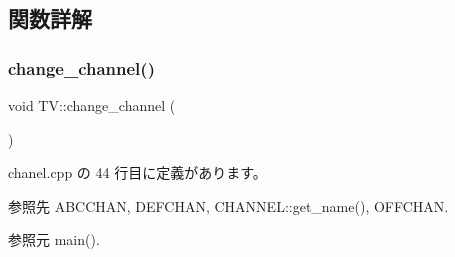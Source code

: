 \subsection{関数詳解}
\mbox{\label{class_t_v_a26370b5928a57c9af9ed35f9c8f34ba4}} 
\subsubsection{\texorpdfstring{change\+\_\+channel()}{change\_channel()}}
{\footnotesize\ttfamily void T\+V\+::change\+\_\+channel (\begin{DoxyParamCaption}{ }\end{DoxyParamCaption})\hspace{0.3cm}{\ttfamily [inline]}}



 chanel.\+cpp の 44 行目に定義があります。



参照先 A\+B\+C\+C\+H\+AN, D\+E\+F\+C\+H\+AN, C\+H\+A\+N\+N\+E\+L\+::get\+\_\+name(), O\+F\+F\+C\+H\+AN.



参照元 main().


